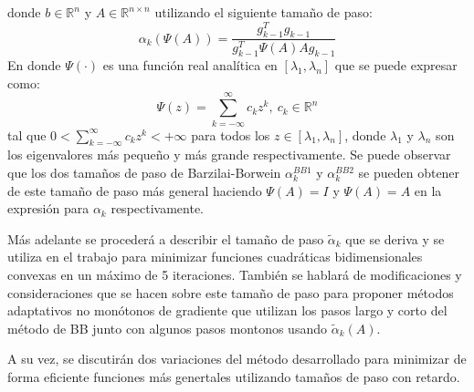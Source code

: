 donde $b\in\mathbb{R}^n$ y $A\in \mathbb{R}^{n\times n}$ utilizando el siguiente tamaño de paso:
$$
	\alpha_k(\Psi(A)) = \frac{g_{k-1}^Tg_{k-1}}{g^T_{k-1}\Psi(A)Ag_{k-1}}
$$
En donde $\Psi(\cdot)$ es una función real analítica en $[\lambda_1, \lambda_n]$ que se puede expresar como:
$$
	\Psi(z) = \sum\limits_{k=-\infty}^{\infty} c_kz^k,\ c_k\in \mathbb{R}^n
$$
tal que $0<\sum_{k =- \infty}^{\infty}c_k z^k<+\infty$ para todos los $z\in[\lambda_1, \lambda_n]$, donde $\lambda_1$ y $\lambda_n$ son los eigenvalores más pequeño y más grande respectivamente. Se puede observar que los dos tamaños de paso de Barzilai-Borwein $\alpha_k^{BB1}$ y $\alpha_k^{BB2}$ se pueden obtener de este tamaño de paso más general haciendo $\Psi(A) = I$ y $\Psi(A) = A$ en la expresión para $\alpha_k$ respectivamente.
\par Más adelante se procederá a describir el tamaño de paso $\tilde{\alpha}_k$ que se deriva y se utiliza en el trabajo para minimizar funciones cuadráticas bidimensionales convexas en un máximo de 5 iteraciones. También se hablará de modificaciones y consideraciones que se hacen sobre este tamaño de paso para proponer métodos adaptativos no monótonos de gradiente que utilizan los pasos largo y corto del método de BB junto con algunos pasos montonos usando $\tilde{\alpha}_k(A)$.
\par A su vez, se discutirán dos variaciones del método desarrollado para minimizar de forma eficiente funciones más genertales utilizando tamaños de paso con retardo.



